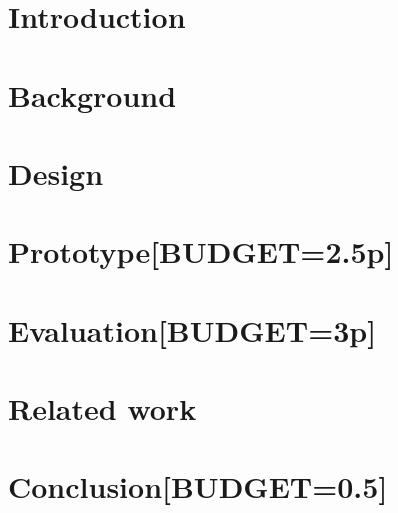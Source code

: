 \section{Introduction}
\label{sec:intro}




\section{Background}
\label{sec:background}


\section{\tcpls Design}
\label{sec:background-design}




\section{\tcpls Prototype[BUDGET=2.5p]}
\label{sec:prototype}



\section{\tcpls Evaluation[BUDGET=3p]}
\label{sec:evaluation}



\section{Related work}
\label{sec:related}


\section{Conclusion[BUDGET=0.5]}
\label{sec:conclusion}




%


